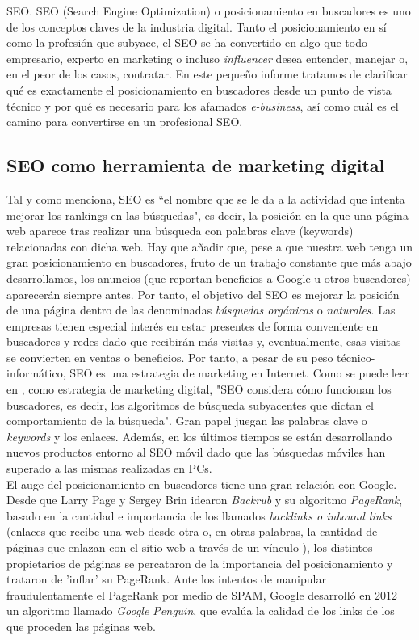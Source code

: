 	\begin{section}{SEO.}
		SEO (Search Engine Optimization) o posicionamiento en buscadores es uno de los conceptos claves de la industria digital. Tanto el posicionamiento en sí como la profesión que subyace, el SEO se ha convertido en algo que todo empresario, experto en marketing o incluso \textit{influencer} desea entender, manejar o, en el peor de los casos, contratar. En este pequeño informe tratamos de clarificar qué es exactamente el posicionamiento en buscadores desde un punto de vista técnico y por qué es necesario para los afamados \textit{e-business}, así como cuál es el camino para convertirse en un profesional SEO.
		
		\subsection{SEO como herramienta de marketing digital}
		Tal y como \cite{redevolution} menciona, SEO es ``el nombre que se le da a la actividad que intenta mejorar los rankings en las búsquedas", es decir, la posición en la que una página web aparece tras realizar una búsqueda con palabras clave (keywords) relacionadas con dicha web. Hay que añadir que, pese a que nuestra web tenga un gran posicionamiento en buscadores, fruto de un trabajo constante que más abajo desarrollamos, los anuncios (que reportan beneficios a Google u otros buscadores) aparecerán siempre antes. Por tanto, el objetivo del SEO es mejorar la posición de una página dentro de las denominadas \textit{búsquedas orgánicas} o \textit{naturales}. Las empresas tienen especial interés en estar presentes de forma conveniente en buscadores y redes dado que recibirán más visitas y, eventualmente, esas visitas se convierten en ventas o beneficios. Por tanto, a pesar de su peso técnico-informático, SEO es una estrategia de marketing en Internet. Como se puede leer en \cite{wiki}, como estrategia de marketing digital, "SEO considera cómo funcionan los buscadores, es decir, los algoritmos de búsqueda subyacentes que dictan el comportamiento de la búsqueda". Gran papel juegan las palabras clave o \textit{keywords} y los enlaces. Además, en los últimos tiempos se están desarrollando nuevos productos entorno al SEO móvil dado que las búsquedas móviles han superado a las mismas realizadas en PCs. \\
		
		El auge del posicionamiento en buscadores tiene una gran relación con Google. Desde que Larry Page y Sergey Brin idearon \textit{Backrub} y su algoritmo \textit{PageRank}, basado en la cantidad e importancia de los llamados \textit{backlinks o inbound links} (enlaces que recibe una web desde otra o, en otras palabras, la cantidad de páginas que enlazan con el sitio web a través de un vínculo \cite{backl}), los distintos propietarios de páginas se percataron de la importancia del posicionamiento y trataron de 'inflar' su PageRank. Ante los intentos de manipular fraudulentamente el PageRank por medio de SPAM, Google desarrolló en 2012 un algoritmo llamado \textit{Google Penguin}, que evalúa la calidad de los links de los que proceden las páginas web.
		

\end{section}
